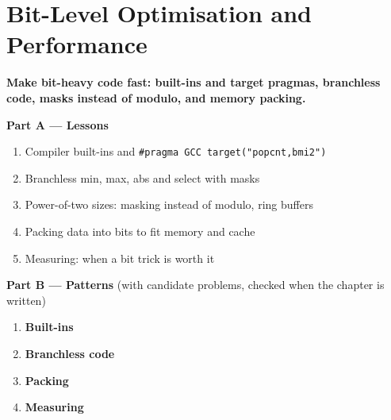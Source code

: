 \chapter{Bit-Level Optimisation and Performance}
\label{ch:optimization}

\begin{tcolorbox}[enhanced, colback=white, colframe=secondaryblue, boxrule=1pt, arc=2mm]
\textbf{\large\textcolor{primaryblue}{Make bit-heavy code fast: built-ins and target pragmas, branchless code, masks instead of modulo, and memory packing.}}
\end{tcolorbox}


\begin{plannedbox}
\textbf{Part A --- Lessons}
\begin{enumerate}[leftmargin=*, label=\textbf{A\arabic*.}, itemsep=1pt]
    \item Compiler built-ins and \texttt{\#pragma GCC target("popcnt,bmi2")}
    \item Branchless min, max, abs and select with masks
    \item Power-of-two sizes: masking instead of modulo, ring buffers
    \item Packing data into bits to fit memory and cache
    \item Measuring: when a bit trick is worth it
\end{enumerate}
\textbf{Part B --- Patterns} (with candidate problems, checked when the chapter is written)
\begin{enumerate}[leftmargin=*, label=\textbf{P\arabic*.}, itemsep=1pt]
    \item \textbf{Built-ins}
    \item \textbf{Branchless code}
    \item \textbf{Packing}
    \item \textbf{Measuring}
\end{enumerate}
\end{plannedbox}
